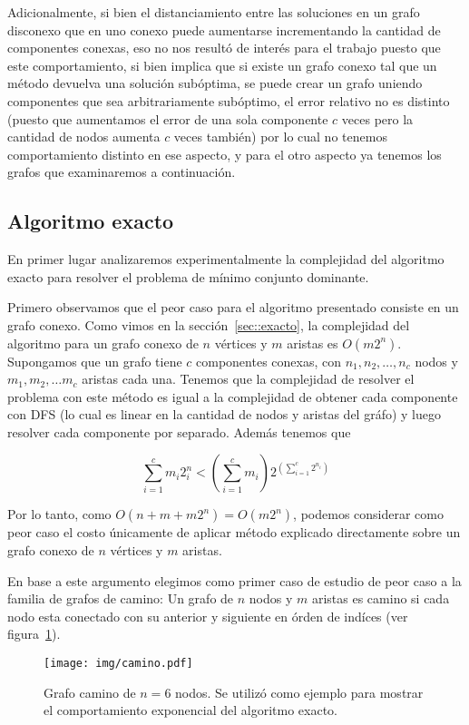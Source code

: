 Adicionalmente, si bien el distanciamiento entre las soluciones en un
grafo disconexo que en uno conexo puede aumentarse incrementando la
cantidad de componentes conexas, eso no nos result\'o de inter\'es para
el trabajo puesto que este comportamiento, si bien implica que si existe
un grafo conexo tal que un m\'etodo devuelva una soluci\'on sub\'optima, 
se puede crear un grafo uniendo componentes que sea arbitrariamente
sub\'optimo, el error relativo no es distinto (puesto que aumentamos
el error de una sola componente $c$ veces pero la cantidad de nodos 
aumenta $c$ veces tambi\'en) por lo cual no tenemos comportamiento 
distinto en ese aspecto, y para el otro aspecto ya tenemos los grafos 
que examinaremos a continuaci\'on.

\subsection{Algoritmo exacto}

En primer lugar analizaremos experimentalmente la complejidad 
del algoritmo exacto para resolver el problema de m\'inimo 
conjunto dominante.

Primero observamos que el peor caso para el
algoritmo presentado consiste en un grafo conexo. Como vimos en la 
secci\'on~\ref{sec::exacto}, la complejidad del algoritmo para un grafo
conexo de $n$ v\'ertices y $m$ aristas es $O(m2^n)$. Supongamos que un
grafo tiene $c$ componentes conexas, con $n_1,n_2,\dots,n_c$ nodos y 
$m_1,m_2, \dots m_c$ aristas cada una. Tenemos que la complejidad de
resolver el problema con este m\'etodo es igual a la complejidad de 
obtener cada componente con DFS (lo cual es linear en la cantidad de 
nodos y aristas del gr\'afo) y luego resolver cada componente por 
separado. Adem\'as tenemos que

\[
\displaystyle \sum_{i = 1}^{c} m_i 2^n_i < \left (\sum_{i = 1}^{c} m_i \right )2^{\left ( \sum_{i = 1}^{c} 2^{n_i} \right )}
\]

Por lo tanto, como $O(n+m+m2^n) = O(m2^n)$, podemos considerar como 
peor caso el costo \'unicamente de aplicar m\'etodo explicado 
directamente sobre un grafo conexo de $n$ v\'ertices y $m$ aristas.

En base a este argumento elegimos como primer caso de estudio de peor
caso a la familia de grafos de camino: Un grafo de $n$ nodos y $m$ 
aristas es camino si cada nodo esta conectado con su anterior y 
siguiente en \'orden de ind\'ices (ver figura~\ref{fig::camino}).

\begin{figure}[H]
	\caption{Grafo camino de $n = 6$ nodos. Se utiliz\'o como ejemplo
	para mostrar el comportamiento exponencial del algoritmo exacto.}
	\label{fig::camino}
	\centering
	\texttt{[image: img/camino.pdf]}
\end{figure} 

